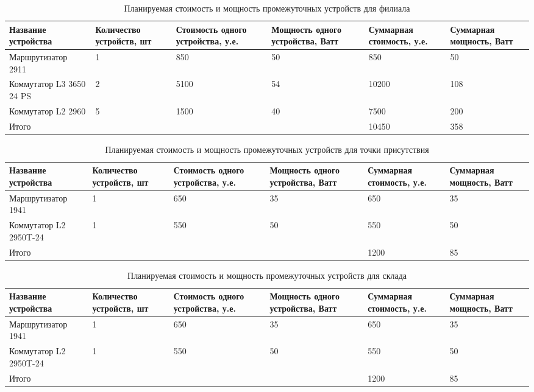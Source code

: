 \documentclass[14pt, a4paper]{extarticle}
\numberwithin{equation}{section}
\begin{document}
\begin{table}[H]
\centering
\small
\caption{Планируемая стоимость и мощность промежуточных устройств для филиала}
\label{table:costFilial}
\begin{tabular}{|m{2.8cm}|m{2.2cm}|m{2.2cm}|m{2.2cm}|m{2.2cm}|m{2.1cm}|}
\hline
\textbf{Название устройства} & \textbf{Количество устройств, шт} & \textbf{Стоимость одного устройства, у.е.} & \textbf{Мощность одного устройства, Ватт} & \textbf{Суммарная стоимость, у.е.} & \textbf{Суммарная мощность, Ватт}\\
\hline
Маршрутизатор 2911 & 1 & 850 & 50 & 850 & 50 \\ \hline
Коммутатор L3 3650 24 PS & 2 & 5100 & 54 & 10200 & 108 \\ \hline
Коммутатор L2 2960 & 5 & 1500 & 40 & 7500 & 200 \\ \hline
\multicolumn{4}{|l|}{Итого} & 10450 & 358 \\ \hline
\end{tabular}
\end{table}

\begin{table}[H]
\centering
\small
\caption{Планируемая стоимость и мощность промежуточных устройств для точки присутствия}
\label{table:costTp}
\begin{tabular}{|m{2.8cm}|m{2.2cm}|m{2.2cm}|m{2.2cm}|m{2.2cm}|m{2.1cm}|}
\hline
\textbf{Название устройства} & \textbf{Количество устройств, шт} & \textbf{Стоимость одного устройства, у.е.} & \textbf{Мощность одного устройства, Ватт} & \textbf{Суммарная стоимость, у.е.} & \textbf{Суммарная мощность, Ватт}\\
\hline
Маршрутизатор 1941 & 1 & 650 & 35 & 650 & 35 \\ \hline
Коммутатор L2 2950T-24 & 1 & 550 & 50 & 550 & 50 \\ \hline
\multicolumn{4}{|l|}{Итого} & 1200 & 85 \\ \hline
\end{tabular}
\end{table}

\begin{table}[H]
\centering
\small
\caption{Планируемая стоимость и мощность промежуточных устройств для склада}
\label{table:costWarehouse}
\begin{tabular}{|m{2.8cm}|m{2.2cm}|m{2.2cm}|m{2.2cm}|m{2.2cm}|m{2.1cm}|}
\hline
\textbf{Название устройства} & \textbf{Количество устройств, шт} & \textbf{Стоимость одного устройства, у.е.} & \textbf{Мощность одного устройства, Ватт} & \textbf{Суммарная стоимость, у.е.} & \textbf{Суммарная мощность, Ватт}\\
\hline
Маршрутизатор 1941 & 1 & 650 & 35 & 650 & 35 \\ \hline
Коммутатор L2 2950T-24 & 1 & 550 & 50 & 550 & 50 \\ \hline
\multicolumn{4}{|l|}{Итого} & 1200 & 85 \\ \hline
\end{tabular}
\end{table}
\end{document}
